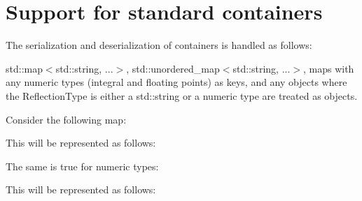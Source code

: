 \chapter{Support for standard containers}
\hypertarget{md_external_2reflect-cpp_2docs_2standard__containers}{}\label{md_external_2reflect-cpp_2docs_2standard__containers}
\label{md_external_2reflect-cpp_2docs_2standard__containers_autotoc_md631}%
%


The serialization and deserialization of containers is handled as follows\+:

{\ttfamily std\+::map\texorpdfstring{$<$}{<}std\+::string, ...\texorpdfstring{$>$}{>}}, {\ttfamily std\+::unordered\+\_\+map\texorpdfstring{$<$}{<}std\+::string, ...\texorpdfstring{$>$}{>}}, maps with any numeric types (integral and floating points) as keys, and any objects where the {\ttfamily Reflection\+Type} is either a {\ttfamily std\+::string} or a numeric type are treated as objects.

Consider the following map\+:


\begin{DoxyCode}{0}

\end{DoxyCode}


This will be represented as follows\+:


\begin{DoxyCode}{0}

\end{DoxyCode}


The same is true for numeric types\+:


\begin{DoxyCode}{0}

\end{DoxyCode}


This will be represented as follows\+:


